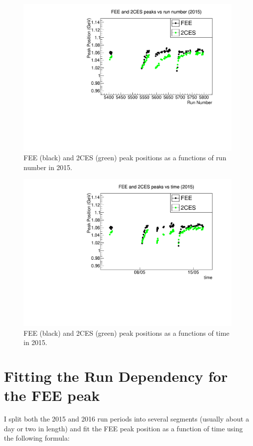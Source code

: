 \documentclass[11pt]{article}
\begin{document}
\begin{figure}[htbp] 
\begin{center}
\includegraphics[width =  .9\textwidth]{figures/2015_run.pdf}
\caption{FEE (black) and 2CES (green) peak positions as a functions of run number in 2015.} 
\label{fig:2015_run}
\end{center}
\end{figure}

\begin{figure}[htbp] 
\begin{center}
\includegraphics[width =  .9\textwidth]{figures/2015_time.pdf}
\caption{FEE (black) and 2CES (green) peak positions as a functions of time in 2015.} 
\label{fig:2015_time}
\end{center}
\end{figure}

\FloatBarrier
\section{Fitting the Run Dependency for the FEE peak}
I split both the 2015 and 2016 run periods into several segments (usually about a day or two in length) and fit the FEE peak position as a function of time using the following formula:
\end{document}
